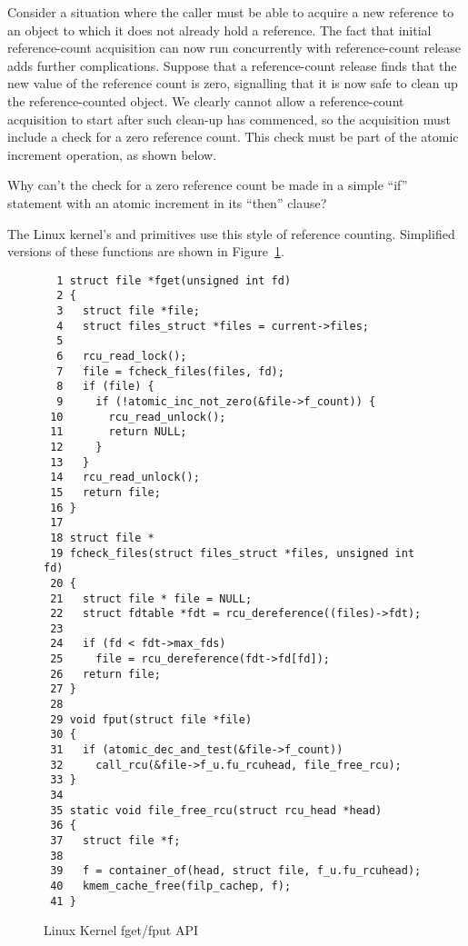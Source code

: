 Consider a situation where the caller must be able to acquire a new
reference to an object to which it does not already hold a reference.
The fact that initial reference-count acquisition can now run concurrently
with reference-count release adds further complications.
Suppose that a reference-count release finds that the new
value of the reference count is zero, signalling that it is
now safe to clean up the reference-counted object.
We clearly cannot allow a reference-count acquisition to
start after such clean-up has commenced, so the acquisition
must include a check for a zero reference count.
This check must be part of the atomic increment operation,
as shown below.

\QuickQuiz{}
	Why can't the check for a zero reference count be
	made in a simple ``if'' statement with an atomic
	increment in its ``then'' clause?
 \QuickQuizEnd

The Linux kernel's  and  primitives
use this style of reference counting.
Simplified versions of these functions are shown in
Figure~\ref{fig:defer:Linux Kernel fget/fput API}.

\begin{figure}[htbp]
{ \scriptsize
\begin{verbatim}
  1 struct file *fget(unsigned int fd)
  2 {
  3   struct file *file;
  4   struct files_struct *files = current->files;
  5
  6   rcu_read_lock();
  7   file = fcheck_files(files, fd);
  8   if (file) {
  9     if (!atomic_inc_not_zero(&file->f_count)) {
 10       rcu_read_unlock();
 11       return NULL;
 12     }
 13   }
 14   rcu_read_unlock();
 15   return file;
 16 }
 17
 18 struct file *
 19 fcheck_files(struct files_struct *files, unsigned int fd)
 20 {
 21   struct file * file = NULL;
 22   struct fdtable *fdt = rcu_dereference((files)->fdt);
 23
 24   if (fd < fdt->max_fds)
 25     file = rcu_dereference(fdt->fd[fd]);
 26   return file;
 27 }
 28
 29 void fput(struct file *file)
 30 {
 31   if (atomic_dec_and_test(&file->f_count))
 32     call_rcu(&file->f_u.fu_rcuhead, file_free_rcu);
 33 }
 34
 35 static void file_free_rcu(struct rcu_head *head)
 36 {
 37   struct file *f;
 38
 39   f = container_of(head, struct file, f_u.fu_rcuhead);
 40   kmem_cache_free(filp_cachep, f);
 41 }
\end{verbatim}
}
\caption{Linux Kernel fget/fput API}
\label{fig:defer:Linux Kernel fget/fput API}
\end{figure}

